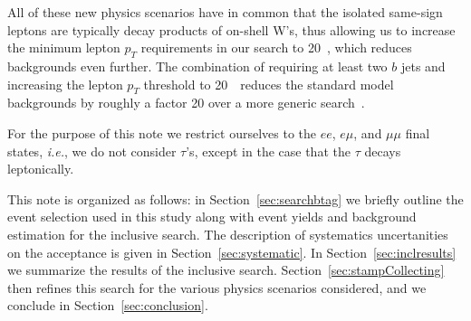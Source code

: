 All of these new physics scenarios have in common that the isolated same-sign leptons are typically decay products of on-shell W's,
thus allowing us to increase the minimum lepton $p_T$ requirements in our search to 20~\GeV, which reduces backgrounds even further.
The combination of requiring at least two $b$ jets and increasing the lepton $p_T$ threshold to 20~\GeV\ reduces the standard model backgrounds
by roughly a factor 20 over a more generic search~\cite{sspaper2010,sspaper2011}.

 
For the purpose of this note we restrict ourselves to the $ee$, $e\mu$, and $\mu\mu$ 
final states, {\em i.e.}, we do not consider $\tau$'s, except in the case that the $\tau$ decays leptonically.

This note is organized as follows: in Section~\ref{sec:searchbtag} we briefly outline the event selection used in this study 
along with event yields and background estimation for the inclusive search.
%
The description of systematics uncertanities on the 
acceptance is given in Section~\ref{sec:systematic}.  
%
In Section~\ref{sec:inclresults} we summarize the results 
of the inclusive search.
Section~\ref{sec:stampCollecting} then refines this search for the various physics scenarios considered, and
we conclude in Section~\ref{sec:conclusion}.






